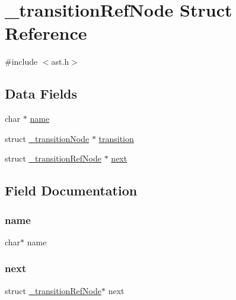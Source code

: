 \hypertarget{struct__transition_ref_node}{}\section{\+\_\+transition\+Ref\+Node Struct Reference}
\label{struct__transition_ref_node}


{\ttfamily \#include $<$ast.\+h$>$}

\subsection*{Data Fields}
\begin{DoxyCompactItemize}
\item 
char $\ast$ \hyperlink{struct__transition_ref_node_a5ac083a645d964373f022d03df4849c8}{name}
\item 
struct \hyperlink{struct__transition_node}{\+\_\+transition\+Node} $\ast$ \hyperlink{struct__transition_ref_node_ab73ce20963a806d4098d62979f680cca}{transition}
\item 
struct \hyperlink{struct__transition_ref_node}{\+\_\+transition\+Ref\+Node} $\ast$ \hyperlink{struct__transition_ref_node_a3f0667f62208e8cfdf3d28916c738bd6}{next}
\end{DoxyCompactItemize}


\subsection{Field Documentation}
\mbox{\label{struct__transition_ref_node_a5ac083a645d964373f022d03df4849c8}} 
\subsubsection{\texorpdfstring{name}{name}}
{\footnotesize\ttfamily char$\ast$ name}

\mbox{\label{struct__transition_ref_node_a3f0667f62208e8cfdf3d28916c738bd6}} 
\subsubsection{\texorpdfstring{next}{next}}
{\footnotesize\ttfamily struct \hyperlink{struct__transition_ref_node}{\+\_\+transition\+Ref\+Node}$\ast$ next}

